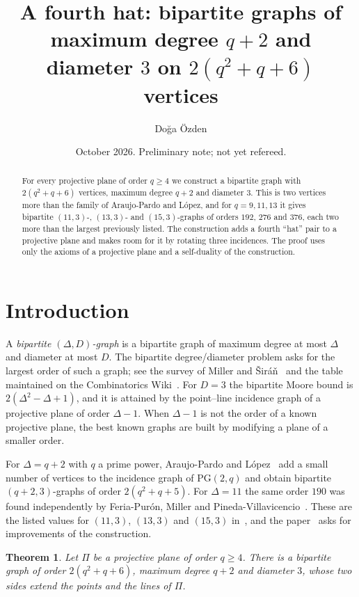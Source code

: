 \documentclass[11pt]{amsart}
\title[A fourth hat]{A fourth hat: bipartite graphs of maximum degree $q+2$ and diameter $3$ on $2(q^2+q+6)$ vertices}
\author{Do\u{g}a \"Ozden}
\date{October 2026. Preliminary note; not yet refereed.}
\newtheorem{theorem}{Theorem}
\theoremstyle{remark}
\newcommand{\PG}{\mathrm{PG}}
\begin{document}
\begin{abstract}
For every projective plane of order $q \ge 4$ we construct a bipartite graph with $2(q^2+q+6)$ vertices, maximum degree $q+2$ and diameter $3$. This is two vertices more than the family of Araujo-Pardo and L\'opez, and for $q = 9, 11, 13$ it gives bipartite $(11,3)$-, $(13,3)$- and $(15,3)$-graphs of orders $192$, $276$ and $376$, each two more than the largest previously listed. The construction adds a fourth ``hat'' pair to a projective plane and makes room for it by rotating three incidences. The proof uses only the axioms of a projective plane and a self-duality of the construction.
\end{abstract}
\maketitle

\section{Introduction}

A \emph{bipartite $(\Delta,D)$-graph} is a bipartite graph of maximum degree at most $\Delta$ and diameter at most $D$. The bipartite degree/diameter problem asks for the largest order of such a graph; see the survey of Miller and \v{S}ir\'a\v{n}~\cite{MS} and the table maintained on the Combinatorics Wiki~\cite{wiki}. For $D = 3$ the bipartite Moore bound is $2(\Delta^2 - \Delta + 1)$, and it is attained by the point--line incidence graph of a projective plane of order $\Delta - 1$. When $\Delta - 1$ is not the order of a known projective plane, the best known graphs are built by modifying a plane of a smaller order.

For $\Delta = q+2$ with $q$ a prime power, Araujo-Pardo and L\'opez~\cite{AL} add a small number of vertices to the incidence graph of $\PG(2,q)$ and obtain bipartite $(q+2,3)$-graphs of order $2(q^2+q+5)$. For $\Delta = 11$ the same order $190$ was found independently by Feria-Pur\'on, Miller and Pineda-Villavicencio~\cite{FMP}. These are the listed values for $(11,3)$, $(13,3)$ and $(15,3)$ in~\cite{wiki}, and the paper~\cite{AL} asks for improvements of the construction.

\begin{theorem}\label{thm:main}
Let $\Pi$ be a projective plane of order $q \ge 4$. There is a bipartite graph of order $2(q^2+q+6)$, maximum degree $q+2$ and diameter $3$, whose two sides extend the points and the lines of $\Pi$.
\end{theorem}
\end{document}
